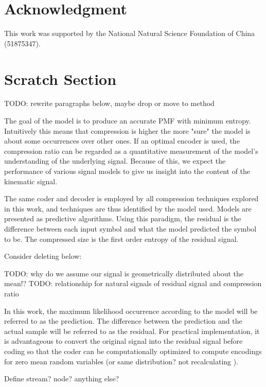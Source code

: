 \documentclass[journal]{IEEEtran}
\begin{document}
\section*{Acknowledgment}
This work was supported by the National Natural Science
Foundation of China (51875347).




{}



\section*{Scratch Section}
TODO: rewrite paragraphs below, maybe drop or move to method

The goal of the model is to produce an accurate PMF with minimum entropy. Intuitively this means that compression is higher the more "sure" the model is about some occurrences over other ones. If an optimal encoder is used, the compression ratio can be regarded as a quantitative measurement of the model's understanding of the underlying signal. Because of this, we expect the performance of various signal models to give us insight into the content of the kinematic signal.

The same coder and decoder is employed by all compression techniques explored in this work, and techniques are thus identified by the model used. Models are presented as predictive algorithms. Using this paradigm, the residual is the difference between each input symbol and what the model predicted the symbol to be. The compressed size is the first order entropy of the residual signal.


Consider deleting below:

TODO: why do we assume our signal is geometrically distributed about the mean!?
TODO: relationship for natural signals of residual signal and compression ratio

In this work, the maximum likelihood occurrence according to the model will be referred to as the prediction. The difference between the prediction and the actual sample will be referred to as the residual. For practical implementation, it is advantageous to convert the original signal into the residual signal before coding so that the coder can be computationally optimized to compute encodings for zero mean random variables (or same distribution? not recalculating ).

Define stream? node? anything else?
\end{document}
